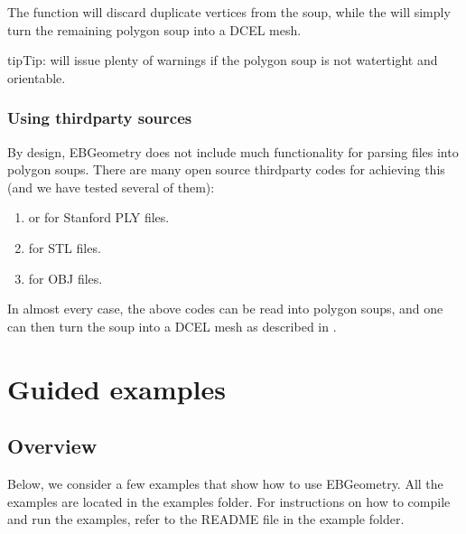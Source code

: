 \documentclass[letterpaper,10pt,english]{sphinxmanual}
\begin{document}
\sphinxAtStartPar
The  function will discard duplicate vertices from the soup, while the  will simply turn the remaining polygon soup into a DCEL mesh.

\begin{sphinxadmonition}{tip}{Tip:}
\sphinxAtStartPar
{} will issue plenty of warnings if the polygon soup is not watertight and orientable.
\end{sphinxadmonition}


\subsection{Using third\sphinxhyphen{}party sources}
\label{\detokenize{Parsers:using-third-party-sources}}\label{\detokenize{Parsers:chap-thirdpartyparser}}
\sphinxAtStartPar
By design, EBGeometry does not include much functionality for parsing files into polygon soups.
There are many open source third\sphinxhyphen{}party codes for achieving this (and we have tested several of them):
\begin{enumerate}
%
\item {} 
\sphinxAtStartPar
{} or  for Stanford PLY files.

\item {} 
\sphinxAtStartPar
{} for STL files.

\item {} 
\sphinxAtStartPar
{} for OBJ files.

\end{enumerate}

\sphinxAtStartPar
In almost every case, the above codes can be read into polygon soups, and one can then turn the soup into a DCEL mesh as described in {\hyperref[\detokenize{Parsers:chap-polysoups}]{}}.


\chapter{Guided examples}
\label{\detokenize{index:guided-examples}}
\sphinxstepscope


\section{Overview}
\label{\detokenize{Examples:overview}}\label{\detokenize{Examples:chap-examples}}\label{\detokenize{Examples::doc}}
\sphinxAtStartPar
Below, we consider a few examples that show how to use EBGeometry.
All the examples are located in the examples folder.
For instructions on how to compile and run the examples, refer to the README file in the example folder.
\end{document}
